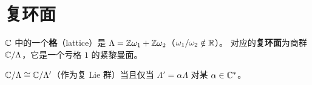 \section{复环面}
\label{sec:complex-tori}

\begin{definition}[格与复环面]
\label{def:lattice-torus}
$\mathbb{C}$ 中的一个\textbf{格}（lattice）是
$\Lambda = \mathbb{Z}\omega_1 + \mathbb{Z}\omega_2$（$\omega_1/\omega_2 \notin \mathbb{R}$）。
对应的\textbf{复环面}为商群 $\mathbb{C}/\Lambda$，它是一个亏格 $1$ 的紧黎曼面。
\end{definition}

\begin{proposition}[复环面的同构分类]
\label{prop:torus-isomorphism}
$\mathbb{C}/\Lambda \cong \mathbb{C}/\Lambda'$（作为复 Lie 群）当且仅当
$\Lambda' = \alpha\Lambda$ 对某 $\alpha \in \mathbb{C}^*$。
\end{proposition}

